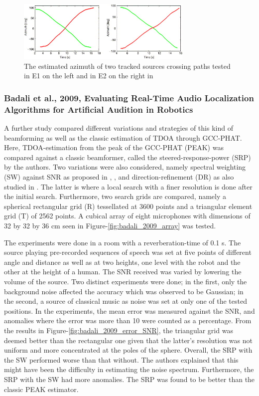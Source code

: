 \documentclass[notitlepage]{report}
\begin{document}
\begin{figure}[H]
\includegraphics[width=0.75\textwidth]{./valin_2007/track.jpg}
\centering
\caption{The estimated azimuth of two tracked sources crossing paths tested in E1 on the left and in E2 on the right in \cite{valin_robust_2007}}
\label{fig:valin_2007_track}
\centering
\end{figure}

\subsubsection{Badali et al., 2009, Evaluating Real-Time Audio Localization Algorithms for Artificial Audition in Robotics}

A further study \cite{badali_evaluating_2009} compared different variations and strategies of this kind of beamforming as well as the classic estimation of TDOA through GCC-PHAT. Here, TDOA-estimation from the peak of the GCC-PHAT (PEAK) was compared against a classic beamformer, called the steered-response-power (SRP) by the authors. Two variations were also considered, namely spectral weighting (SW) against SNR as proposed in \cite{valin_robust_2003}, \cite{valin_localization_2004}, \cite{valin_robust_2007} and direction-refinement (DR) as also studied in \cite{valin_robust_2007}. The latter is where a local search with a finer resolution is done after the initial search. Furthermore, two search grids are compared, namely a spherical rectangular grid (R) tessellated at 3600 points and a triangular element grid (T) of 2562 points. A cubical array of eight microphones with dimensions of 32 by 32 by 36 \si{cm} seen in Figure-\ref{fig:badali_2009_array} was tested. 

The experiments were done in a room with a reverberation-time of 0.1 \si{s}. The source playing pre-recorded sequences of speech was set at five points of different angle and distance as well as at two heights, one level with the robot and the other at the height of a human. The SNR received was varied by lowering the volume of the source. Two distinct experiments were done; in the first, only the background noise affected the accuracy which was observed to be Gaussian; in the second, a source of classical music as noise was set at only one of the tested positions. In the experiments, the mean error was measured against the SNR, and anomalies where the error was more than 10 \si{\deg} were counted as a percentage. From the results in Figure-\ref{fig:badali_2009_error_SNR}, the triangular grid was deemed better than the rectangular one given that the latter's resolution was not uniform and more concentrated at the poles of the sphere. Overall, the SRP with the SW performed worse than that without. The authors explained that this might have been the difficulty in estimating the noise spectrum. Furthermore, the SRP with the SW had more anomalies. The SRP was found to be better than the classic PEAK estimator.
\end{document}
